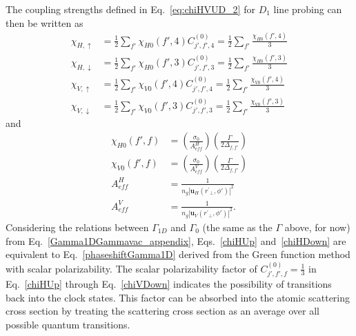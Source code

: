 The coupling strengths defined in Eq.~\eqref{eq:chiHVUD_2} for $ D_1 $ line probing can then be written as
\begin{align}
\chi_{H,\uparrow} &=   \frac{1}{2} \sum_{f'} \chi_{H0}(f',4) C_{j',f',4}^{(0)}  =  \frac{1}{2} \sum_{f'} \frac{\chi_{H0}(f',4)}{3} \label{chiHUp}  \\
\chi_{H,\downarrow} &=   \frac{1}{2} \sum_{f'} \chi_{H0}(f',3)  C_{j',f',3}^{(0)} = \frac{1}{2} \sum_{f'} \frac{\chi_{H0}(f',3) }{3} \label{chiHDown}\\
\chi_{V,\uparrow} &=   \frac{1}{2} \sum_{f'} \chi_{V0}(f',4)  C_{j',f',4}^{(0)}  =   \frac{1}{2} \sum_{f'} \frac{\chi_{V0}(f',4)}{3}\label{chiVUp}  \\
\chi_{V,\downarrow} &=   \frac{1}{2} \sum_{f'} \chi_{V0}(f',3)  C_{j',f',3}^{(0)}=   \frac{1}{2} \sum_{f'} \frac{\chi_{V0}(f',3) }{3} \label{chiVDown}
\end{align}
and 
\begin{align}
\chi_{H0}(f',f) &= \left( \frac{ \sigma_0}{A_{ef\!f}^H} \right) \left( \frac{\Gamma}{2 \Delta_{f,f'}} \right)\\
\chi_{V0}(f',f) &= \left( \frac{ \sigma_0}{A_{ef\!f}^V} \right) \left( \frac{\Gamma}{2 \Delta_{f,f'}} \right)\\
A_{ef\!f}^H &= \frac{1}{n_g|\mathbf{u}_{H}(r^\prime\!\!_\perp,\phi')|^2}\\
A_{ef\!f}^V &= \frac{1}{n_g | \mathbf{u}_{V}(r^\prime\!\!_\perp,\phi')|^2}.\label{eq:AeffV}
\end{align}
Considering the relations between $ \Gamma_{1D} $ and $ \Gamma_0 $ (the same as the $ \Gamma $ above, for now) from Eq.~\eqref{Gamma1DGammavac_appendix}, Eqs.~\eqref{chiHUp} and~\eqref{chiHDown} are equivalent to Eq.~\eqref{phaseshiftGamma1D} derived from the Green function method with scalar polarizability. The scalar polarizability factor of $ C_{j',f',f}^{(0)}=\frac{1}{3} $ in Eq.~\eqref{chiHUp} through Eq.~\eqref{chiVDown} indicates the possibility of transitions back into the clock states. This factor can be absorbed into the atomic scattering cross section by treating the scattering cross section as an average over all possible quantum transitions. 


